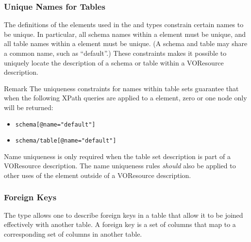 \documentclass[11pt,a4paper]{ivoa}
\begin{document}
\subsubsection{Unique Names for Tables}
\label{sect:unique}


The definitions of the  elements used in
the  and
 types
constrain certain names to be unique.  In particular, all schema names
within a  element must be unique, and all
table names within a  element must be
unique.  (A schema and table may share a common name, such as
``default''.)  These constraints makes it possible to uniquely locate
the description of a schema or table within a VOResource description.  


\begin{admonition}{Remark}
The uniqueness constraints for names
within table sets guarantee that when the following XPath queries are
applied to a  element, zero or one node
only will be returned:

\begin{itemize}
\item\verb|schema[@name="default"]|
\item\verb|schema/table[@name="default"]|
\end{itemize}
\end{admonition}

Name uniqueness is only required when the table set description is
part of a VOResource description.  The name uniqueness rules
\emph{should} also be applied to other uses of the
 element outside of a VOResource
description.  


\subsubsection{Foreign Keys}
\label{sect:fkey}


The  type allows one to describe foreign
keys in a table that allow it to be joined effectively with another
table.  A foreign key is a set of columns that map to a corresponding
set of columns in another table.  
\end{document}
